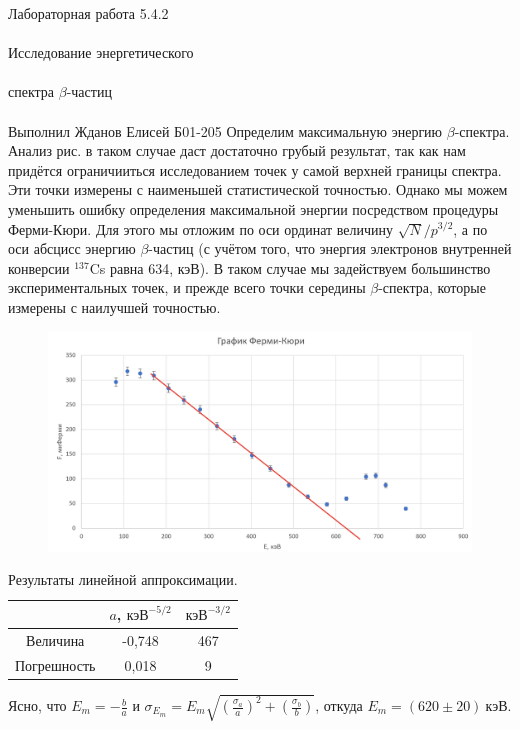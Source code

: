 \documentclass{astroedu-lab}
\begin{document}
\begin{problem}{\huge Лабораторная работа 5.4.2\\\\Исследование энергетического\\\\спектра $\beta$-частиц\\\\Выполнил Жданов Елисей Б01-205}
		\newpage
		Определим максимальную энергию $\beta$-спектра. Анализ рис. в таком случае даст достаточно грубый результат, так как нам придётся ограничииться исследованием точек у самой верхней границы спектра. Эти точки измерены с наименьшей статистической точностью. Однако мы можем уменьшить ошибку определения максимальной энергии посредством процедуры Ферми-Кюри. Для этого мы отложим по оси ординат величину $\sqrt{N}/p^{3/2}$, а по оси абсцисс энергию $\beta$-частиц (с учётом того, что энергия электронов внутренней конверсии $^{137}$Cs равна 634, кэВ). В таком случае мы задействуем большинство экспериментальных точек, и прежде всего точки середины $\beta$-спектра, которые измерены с наилучшей точностью.

\begin{figure}[!h]
	\centering
	\includegraphics[width=1\textwidth]{bara.png}
	\label{fig:boiler}
\end{figure}
		
		\begin{table}[H]
			\caption{Результаты линейной аппроксимации.}
			\label{table:Emax}
			\begin{tabular}{|c|c|c|}
				\hline
				& $a$, $\text{кэВ}^{-5/2}$ & $\text{кэВ}^{-3/2}$ \\ \hline
							Величина    & -0,748                                                        & 467                                                                     \\ \hline
							Погрешность & 0,018                                                         & 9                                                                       \\ \hline
						\end{tabular}
		\end{table}
		Ясно, что $E_m = - \frac{b}{a}$ и $\sigma_{E_m} = E_m \sqrt{\left(\frac{\sigma_a}{a}\right)^2 + \left(\frac{\sigma_b}{b}\right)}$, откуда $E_m =(620 \pm 20) \ \text{кэВ}.$









\end{problem}
\end{document}
